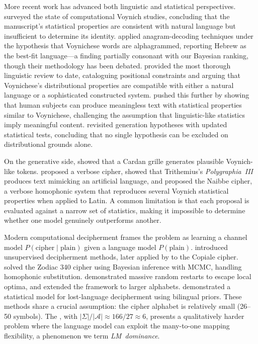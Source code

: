 More recent work has advanced both linguistic and statistical perspectives.  \citet{reddy2011} surveyed the state of computational Voynich studies, concluding that the manuscript's statistical properties are consistent with natural language but insufficient to determine its identity.  \citet{hauer2016} applied anagram-decoding techniques under the hypothesis that Voynichese words are alphagrammed, reporting Hebrew as the best-fit language---a finding partially consonant with our Bayesian ranking, though their methodology has been debated.  \citet{bowern2021} provided the most thorough linguistic review to date, cataloguing positional constraints and arguing that Voynichese's distributional properties are compatible with either a natural language or a sophisticated constructed system.  \citet{gaskell2022} pushed this further by showing that human subjects can produce meaningless text with statistical properties similar to Voynichese, challenging the assumption that linguistic-like statistics imply meaningful content.  \citet{timm2024} revisited generation hypotheses with updated statistical tests, concluding that no single hypothesis can be excluded on distributional grounds alone.

On the generative side, \citet{rugg2004} showed that a Cardan grille generates plausible Voynich-like tokens.  \citet{timm2020} proposed a verbose cipher, \citet{hermes2022b} showed that Trithemius's \textit{Polygraphia~III} produces text mimicking an artificial language, and \citet{greshko2025} proposed the Naibbe cipher, a verbose homophonic system that reproduces several Voynich statistical properties when applied to Latin.  A common limitation is that each proposal is evaluated against a narrow set of statistics, making it impossible to determine whether one model genuinely outperforms another.

Modern computational decipherment frames the problem as learning a channel model $P(\text{cipher} \mid \text{plain})$ given a language model $P(\text{plain})$.  \citet{knight2006} introduced unsupervised decipherment methods, later applied by \citet{knight2011} to the Copiale cipher.  \citet{ravi2011} solved the Zodiac 340 cipher using Bayesian inference with MCMC, handling homophonic substitution.  \citet{berg2013} demonstrated massive random restarts to escape local optima, and \citet{nuhn2012, nuhn2014} extended the framework to larger alphabets.  \citet{snyder2010} demonstrated a statistical model for lost-language decipherment using bilingual priors.  These methods share a crucial assumption: the cipher alphabet is relatively small (26--50 symbols).  The \vms{}, with $|\Sigma|/|\mathcal{A}| \approx 166/27 \approx 6$, presents a qualitatively harder problem where the language model can exploit the many-to-one mapping flexibility, a phenomenon we term \emph{LM~dominance}.


